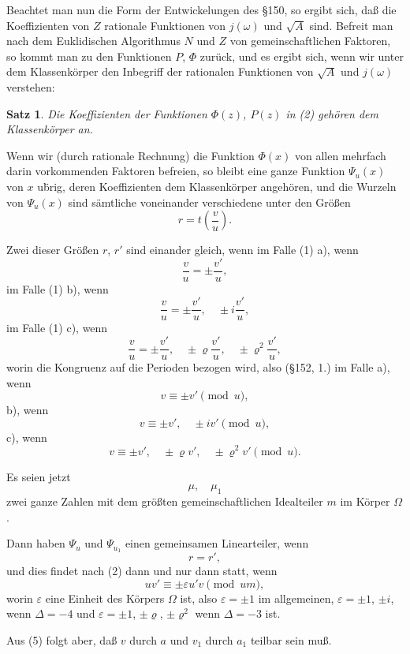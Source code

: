 \documentclass[12pt,a4paper]{article}
\newtheorem*{satz}{Satz}
\begin{document}
Beachtet man nun die Form der Entwickelungen des \S 150, so ergibt sich, da\ss{} die Koeffizienten von $Z$ rationale Funktionen von $j(\omega)$ und $\sqrt{A}$ sind. Befreit man nach dem Euklidischen Algorithmus $N$ und $Z$ von gemeinschaftlichen Faktoren, so kommt man zu den Funktionen $P$, $\Phi$ zur\"uck, und es ergibt sich, wenn wir unter dem Klassenk\"orper den Inbegriff der rationalen Funktionen von $\sqrt{A}$ und $j(\omega)$ verstehen:

\begin{satz}
Die Koeffizienten der Funktionen $\Phi(z)$, $P(z)$ in (2) geh\"oren dem Klassenk\"orper an.
\end{satz}

Wenn wir (durch rationale Rechnung) die Funktion $\Phi(x)$ von allen mehrfach darin vorkommenden Faktoren befreien, so bleibt eine ganze Funktion $\Psi_u(x)$ von $x$ u\"brig, deren Koeffizienten dem Klassenk\"orper angeh\"oren, und die Wurzeln von $\Psi_u(x)$ sind s\"amtliche voneinander verschiedene unter den Gr\"o\ss{}en
\[r = t\left(\frac{v}{u}\right).\]

Zwei dieser Gr\"o\ss{}en $r$, $r'$ sind einander gleich, wenn im Falle (1) a), wenn
\[\frac{v}{u} = \pm\frac{v'}{u},\]
im Falle (1) b), wenn
\[\frac{v}{u} = \pm\frac{v'}{u}, \quad \pm i\frac{v'}{u},\]
im Falle (1) c), wenn
\[\frac{v}{u} = \pm\frac{v'}{u}, \quad \pm \varrho\frac{v'}{u}, \quad \pm \varrho^2\frac{v'}{u},\]
worin die Kongruenz auf die Perioden bezogen wird, also (\S 152, 1.) im Falle a), wenn
\[v \equiv \pm v' \pmod{u},\]
b), wenn
\[v \equiv \pm v', \quad \pm iv' \pmod{u},\]
c), wenn
\[v \equiv \pm v', \quad \pm \varrho v', \quad \pm \varrho^2 v' \pmod{u}.\]

Es seien jetzt
\begin{equation}\mu, \quad \mu_1\end{equation}
zwei ganze Zahlen mit dem gr\"o\ss{}ten gemeinschaftlichen Idealteiler $m$ im K\"orper $\Omega$.

Dann haben $\Psi_u$ und $\Psi_{u_1}$ einen gemeinsamen Linearteiler, wenn
\[r = r',\]
und dies findet nach (2) dann und nur dann statt, wenn
\begin{equation}uv' \equiv \pm \varepsilon u'v \pmod{um},\end{equation}
worin $\varepsilon$ eine Einheit des K\"orpers $\Omega$ ist, also $\varepsilon = \pm 1$ im allgemeinen, $\varepsilon = \pm 1$, $\pm i$, wenn $\Delta = -4$ und $\varepsilon = \pm 1$, $\pm \varrho$, $\pm \varrho^2$ wenn $\Delta = -3$ ist.

Aus (5) folgt aber, da\ss{} $v$ durch $a$ und $v_1$ durch $a_1$ teilbar sein mu\ss{}.
\end{document}
